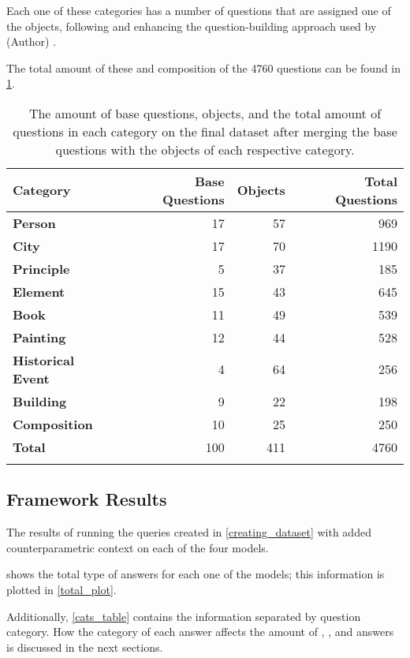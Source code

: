 Each one of these categories has a number of questions that are assigned one of the objects, following and enhancing the question-building approach used by (Author) \cite{factual_recall}.

The total amount of these and composition of the 4760 questions can be found in \cref{category_amounts}.

\begin{table}[ht]
	\centering
	\footnotesize
	\begin{tabular}{>{\bfseries}l r r r}
		\toprule
			\bfseries Category & \bfseries Base Questions & \bfseries Objects & \bfseries Total Questions \\
		\midrule
			Person           &  17 &  57 &  969 \\
			City             &  17 &  70 & 1190 \\
			Principle        &   5 &  37 &  185 \\
			Element          &  15 &  43 &  645 \\
			Book             &  11 &  49 &  539 \\
			Painting         &  12 &  44 &  528 \\
			Historical Event &   4 &  64 &  256 \\
			Building         &   9 &  22 &  198 \\
			Composition      &  10 &  25 &  250 \\
		\midrule
			Total            & 100 & 411 & 4760 \\
		\bottomrule \addlinespace[4pt]
	\end{tabular}
	\caption{The amount of base questions, objects, and the total amount of questions in each category on the final dataset after merging the base questions with the objects of each respective category.}
	\label{category_amounts}
\end{table}

\subsection{Framework Results}
\label{framework_results}

The results of running the queries created in \cref{creating_dataset} with added counterparametric context on each of the four models.

 shows the total type of answers for each one of the models; this information is plotted in \cref{total_plot}.

Additionally, \cref{cats_table} contains the information separated by question category.
How the category of each answer affects the amount of \Parametric{}, \Contextual{}, and \Other{} answers is discussed in the next sections.

